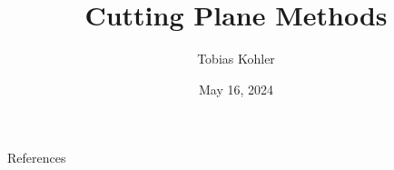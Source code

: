 




\title{Cutting Plane Methods}
\author{Tobias Kohler}
\date{May 16, 2024}



\begin{frame}
    \maketitle
\end{frame}













\begin{frame}{References}
    \printbibliography
\end{frame}
 
